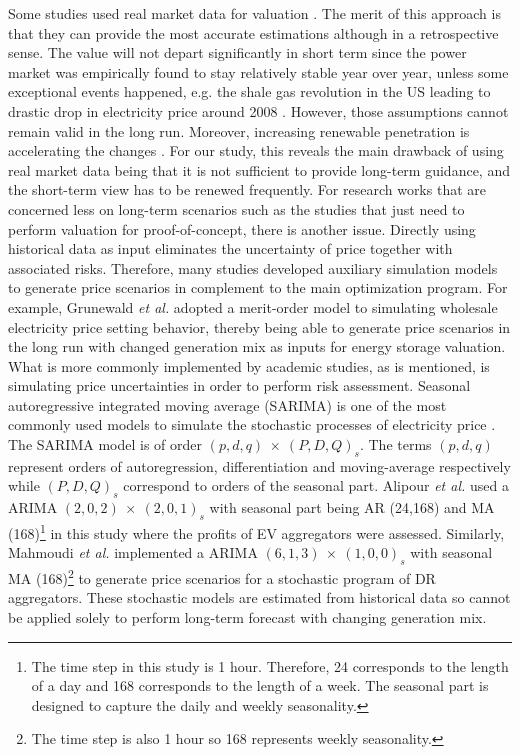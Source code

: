 Some studies used real market data for valuation \cite{Walawalkar2007,Sioshansi2009,Byrne2012,Bradbury2014,McConnell2015,Berrada2016,Salles2017}. The merit of this approach is that they can provide the most accurate estimations although in a retrospective sense. The value will not depart significantly in short term since the power market was empirically found to stay relatively stable year over year, unless some exceptional events happened, e.g. the shale gas revolution in the US leading to drastic drop in electricity price around 2008 \cite{Brown2015,Salles2017}. However, those assumptions cannot remain valid in the long run. Moreover, increasing renewable penetration is accelerating the changes \cite{Woo2011,Gelabert2011,Mulder2013,Forrest2013,Wurzburg2013,Clo2015,Cludius2014}. 
For our study, this reveals the main drawback of using real market data being that it is not sufficient to provide long-term guidance, and the short-term view has to be renewed frequently. For research works that are concerned less on long-term scenarios such as the studies that just need to perform valuation for proof-of-concept, there is another issue. Directly using historical data as input eliminates the uncertainty of price together with associated risks.
Therefore, many studies developed auxiliary simulation models to generate price scenarios in complement to the main optimization program. For example, Grunewald \textit{et al.} \cite{Grunewald2012a} adopted a merit-order model to simulating wholesale electricity price setting behavior, thereby being able to generate price scenarios in the long run with changed generation mix as inputs for energy storage valuation. What is more commonly implemented by academic studies, as is mentioned, is simulating price uncertainties  in order to perform risk assessment. Seasonal autoregressive integrated moving average (SARIMA) is one of the most commonly used models to simulate the stochastic processes of electricity price \cite{Weron2014,Ziel2015,Mahmoudi2017,Alipour2017}. The SARIMA model is of order $(p,d,q)~\times~(P,D,Q)_s$. The terms $(p,d,q)$ represent orders of autoregression, differentiation and moving-average respectively while $(P,D,Q)_s$ correspond to orders of the seasonal part.
Alipour \textit{et al.} used a ARIMA $(2,0,2)~\times~(2,0,1)_s$ with seasonal part being AR (24,168) and MA (168)\footnote{The time step in this study is 1 hour. Therefore, 24 corresponds to the length of a day and 168 corresponds to the length of a week. The seasonal part is designed to capture the daily and weekly seasonality.} in this study where the profits of EV aggregators were assessed. Similarly, Mahmoudi \textit{et al.} \cite{Mahmoudi2017} implemented a ARIMA $(6,1,3)~\times~(1,0,0)_s$ with seasonal MA (168)\footnote{The time step is also 1 hour so 168 represents weekly seasonality.} to generate price scenarios for a stochastic program of DR aggregators. These stochastic models are estimated from historical data so cannot be applied solely to perform long-term forecast with changing generation mix.

